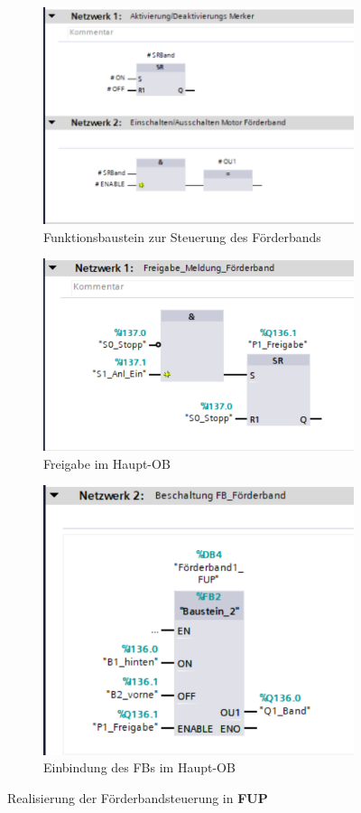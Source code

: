 \begin{figure}[H]
	\centering
	\label{fig: Beispiel FUP}
	\begin{subfigure}[b]{0.49\textwidth}
		\centering
		\includegraphics[width=0.8\linewidth]{images/PrgBeispiel_FUP}
		\caption{Funktionsbaustein zur Steuerung des Förderbands}
	\end{subfigure}
	\hfill
	\begin{subfigure}[b]{0.49\textwidth}
		\centering
		\includegraphics[width=0.8\linewidth]{images/PrgBeispiel_FUP_2}
		\caption{Freigabe im Haupt-OB}
	\end{subfigure}
	
	\vspace{0.5cm}
	
	\begin{subfigure}[b]{0.45\textwidth}
		\centering
		\includegraphics[width=0.8\linewidth]{images/PrgBeispiel_FUP_3}
		\caption{Einbindung des FBs im Haupt-OB}
	\end{subfigure}
	\caption{Realisierung der Förderbandsteuerung in \textbf{FUP}}
\end{figure}

